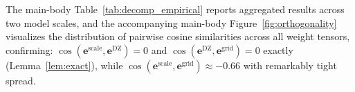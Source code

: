 \documentclass{article}
\theoremstyle{definition}
\theoremstyle{remark}
\DeclareMathOperator{\rank}{rank}
\newcommand{\Reals}{\mathbb{R}}
\newcommand{\be}{\bm{e}}
\newcommand{\bE}{\bm{E}}
\newcommand{\bW}{\bm{W}}
\newcommand{\norm}[1]{\left\|#1\right\|}
\begin{document}
The main-body Table~\ref{tab:decomp_empirical} reports aggregated results across two model scales, and the accompanying main-body Figure~\ref{fig:orthogonality} visualizes the distribution of pairwise cosine similarities across all weight tensors, confirming: $\cos(\be^{\mathrm{scale}}, \be^{\mathrm{DZ}}) = 0$ and $\cos(\be^{\mathrm{DZ}}, \be^{\mathrm{grid}}) = 0$ exactly (Lemma~\ref{lem:exact}), while $\cos(\be^{\mathrm{scale}}, \be^{\mathrm{grid}}) \approx -0.66$ with remarkably tight spread.








\end{document}

